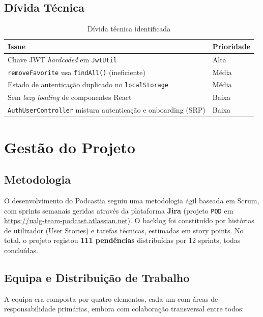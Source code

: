 \documentclass[12pt, a4paper]{report}
\begin{document}
\section{Dívida Técnica}

\begin{table}[H]
  \centering
  \begin{tabularx}{\textwidth}{X L{2.5cm}}
    \toprule
    \textbf{Issue} & \textbf{Prioridade} \\
    \midrule
    Chave JWT \emph{hardcoded} em \texttt{JwtUtil} & Alta \\
    \texttt{removeFavorite} usa \texttt{findAll()} (ineficiente) & Média \\
    Estado de autenticação duplicado no \texttt{localStorage} & Média \\
    Sem \emph{lazy loading} de componentes React & Baixa \\
    \texttt{AuthUserController} mistura autenticação e onboarding (SRP) & Baixa \\
    \bottomrule
  \end{tabularx}
  \caption{Dívida técnica identificada}
\end{table}

\chapter{Gestão do Projeto}
\label{chap:gestao}

\section{Metodologia}

O desenvolvimento do Podcastia seguiu uma metodologia ágil baseada em Scrum,
com sprints semanais geridas através da plataforma \textbf{Jira} (projeto
\texttt{POD} em \url{https://ualg-team-podcast.atlassian.net}). O backlog foi
constituído por histórias de utilizador (User Stories) e tarefas técnicas,
estimadas em story points. No total, o projeto registou \textbf{111 pendências}
distribuídas por 12 sprints, todas concluídas.

\section{Equipa e Distribuição de Trabalho}

A equipa era composta por quatro elementos, cada um com áreas de responsabilidade
primárias, embora com colaboração transversal entre todos:
\end{document}
